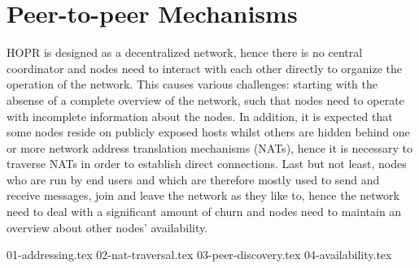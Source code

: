 \section{Peer-to-peer Mechanisms}
\label{sec:p2p}

HOPR is designed as a decentralized network, hence there is no central coordinator and nodes need to interact with each other directly to organize the operation of the network. This causes various challenges: starting with the absense of a complete overview of the network, such that nodes need to operate with incomplete information about the nodes. In addition, it is expected that some nodes reside on publicly exposed hosts whilst others are hidden behind one or more network address translation mechanisms (NATs), hence it is necessary to traverse NATs in order to establish direct connections. Last but not least, nodes who are run by end users and which are therefore mostly used to send and receive messages, join and leave the network as they like to, hence the network need to deal with a significant amount of churn and nodes need to maintain an overview about other nodes' availability.

{01-addressing.tex}
{02-nat-traversal.tex}
{03-peer-discovery.tex}
{04-availability.tex}





